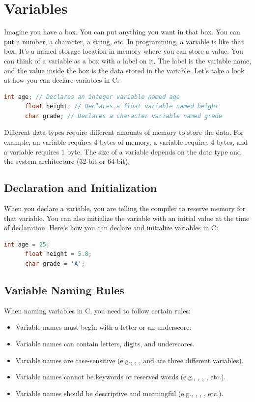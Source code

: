 \documentclass[12pt, openany]{book}
\begin{document}
  \section{Variables}
  Imagine you have a box. You can put anything you want in that box. You can put a number, a character, a string, etc. In programming, a variable is like that box. It's a named storage location in memory where you can store a value. You can think of a variable as a box with a label on it. The label is the variable name, and the value inside the box is the data stored in the variable. Let's take a look at how you can declare variables in C:
  \begin{lstlisting}[language=C, caption=Declaring Variables in C]
      int age; // Declares an integer variable named age
      float height; // Declares a float variable named height
      char grade; // Declares a character variable named grade
  \end{lstlisting}
  \noindent Different data types require different amounts of memory to store the data. For example, an  variable requires 4 bytes of memory, a  variable requires 4 bytes, and a  variable requires 1 byte. The size of a variable depends on the data type and the system architecture (32-bit or 64-bit).
  
  \subsection{Declaration and Initialization}
  When you declare a variable, you are telling the compiler to reserve memory for that variable. You can also initialize the variable with an initial value at the time of declaration. Here's how you can declare and initialize variables in C:
  \begin{lstlisting}[language=C, caption=Declaring and Initializing Variables in C]
      int age = 25;
      float height = 5.8; 
      char grade = 'A';
  \end{lstlisting}
  
  \subsection{Variable Naming Rules}
  When naming variables in C, you need to follow certain rules:
  \begin{itemize}
      \item Variable names must begin with a letter or an underscore.
      \item Variable names can contain letters, digits, and underscores.
      \item Variable names are case-sensitive (e.g., , , and  are three different variables).
      \item Variable names cannot be keywords or reserved words (e.g., , , , etc.).
      \item Variable names should be descriptive and meaningful (e.g., , , , etc.).
  \end{itemize}
  
\end{document}
